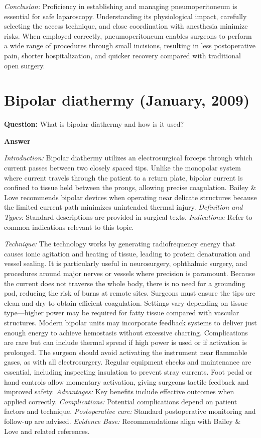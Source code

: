 \documentclass{article}
\begin{document}
\emph{Conclusion:} Proficiency in establishing and managing pneumoperitoneum is essential for safe laparoscopy. Understanding its physiological impact, carefully selecting the access technique, and close coordination with anesthesia minimize risks. When employed correctly, pneumoperitoneum enables surgeons to perform a wide range of procedures through small incisions, resulting in less postoperative pain, shorter hospitalization, and quicker recovery compared with traditional open surgery.


\section{Bipolar diathermy (January, 2009)}

\textbf{Question:} What is bipolar diathermy and how is it used?

\textbf{Answer}

\emph{Introduction:} Bipolar diathermy utilizes an electrosurgical forceps through which current passes between two closely spaced tips. Unlike the monopolar system where current travels through the patient to a return plate, bipolar current is confined to tissue held between the prongs, allowing precise coagulation. Bailey & Love recommends bipolar devices when operating near delicate structures because the limited current path minimizes unintended thermal injury.
\emph{Definition and Types:} Standard descriptions are provided in surgical texts.
\emph{Indications:} Refer to common indications relevant to this topic.

\emph{Technique:} The technology works by generating radiofrequency energy that causes ionic agitation and heating of tissue, leading to protein denaturation and vessel sealing. It is particularly useful in neurosurgery, ophthalmic surgery, and procedures around major nerves or vessels where precision is paramount. Because the current does not traverse the whole body, there is no need for a grounding pad, reducing the risk of burns at remote sites. Surgeons must ensure the tips are clean and dry to obtain efficient coagulation. Settings vary depending on tissue type—higher power may be required for fatty tissue compared with vascular structures. Modern bipolar units may incorporate feedback systems to deliver just enough energy to achieve hemostasis without excessive charring. Complications are rare but can include thermal spread if high power is used or if activation is prolonged. The surgeon should avoid activating the instrument near flammable gases, as with all electrosurgery. Regular equipment checks and maintenance are essential, including inspecting insulation to prevent stray currents. Foot pedal or hand controls allow momentary activation, giving surgeons tactile feedback and improved safety.
\emph{Advantages:} Key benefits include effective outcomes when applied correctly.
\emph{Complications:} Potential complications depend on patient factors and technique.
\emph{Postoperative care:} Standard postoperative monitoring and follow-up are advised.
\emph{Evidence Base:} Recommendations align with Bailey & Love and related references.
\end{document}
